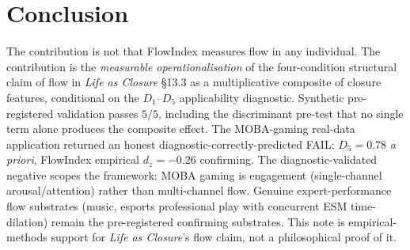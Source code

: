\documentclass[11pt,a4paper]{article}
\begin{document}
\section{Conclusion}\label{sec:conclusion}

The contribution is not that FlowIndex measures flow in any individual. The contribution is the \emph{measurable operationalisation} of the four-condition structural claim of flow in \emph{Life as Closure} \S 13.3 as a multiplicative composite of closure features, conditional on the $D_1$--$D_5$ applicability diagnostic. Synthetic pre-registered validation passes $5/5$, including the discriminant pre-test that no single term alone produces the composite effect. The MOBA-gaming real-data application returned an honest diagnostic-correctly-predicted FAIL: $D_5 = 0.78$ \emph{a priori}, FlowIndex empirical $d_z = -0.26$ confirming. The diagnostic-validated negative scopes the framework: MOBA gaming is engagement (single-channel arousal/attention) rather than multi-channel flow. Genuine expert-performance flow substrates (music, esports professional play with concurrent ESM time-dilation) remain the pre-registered confirming substrates. This note is empirical-methods support for \emph{Life as Closure}'s flow claim, not a philosophical proof of it.



\end{document}
